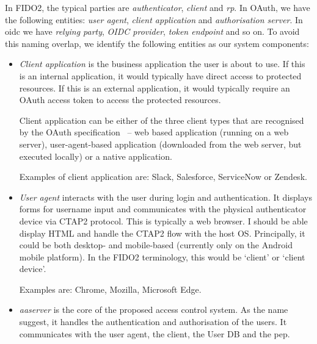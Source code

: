 In FIDO2, the typical parties are \textit{authenticator}, \textit{client} and \textit{\acrshort{rp}}. In OAuth, we have the following entities: \textit{user agent}, \textit{client application} and \textit{authorisation server}. In \acrshort{oidc} we have \textit{relying party}, \textit{OIDC provider}, \textit{token endpoint} and so on. To avoid this naming overlap, we identify the following entities as our system components:
% 
\begin{itemize}
    \item \textit{Client application} is the business application the user is about to use. If this is an internal application, it would typically have direct access to protected resources. If this is an external application, it would typically require an OAuth access token to access the protected resources.
    
    Client application can be either of the three client types that are recognised by the OAuth specification~\cite{Hardt2012TheFramework} -- web based application (running on a web server), user-agent-based application (downloaded from the web server, but executed locally) or a native application.
    
    Examples of client application are: Slack, Salesforce, ServiceNow or Zendesk.
    
    \item \textit{User agent} interacts with the user during login and authentication. It displays forms for username input and communicates with the physical authenticator device via CTAP2 protocol. This is typically a web browser. I should be able display HTML and handle the CTAP2 flow with the host OS. Principally, it could be both desktop- and mobile-based (currently only on the Android mobile platform). In the FIDO2 terminology, this would be `client' or `client device'.
    
    Examples are: Chrome, Mozilla, Microsoft Edge.
    
    \item \textit{\acrfull{aaserver}} is the core of the proposed access control system. As the name suggest, it handles the authentication and authorisation of the users. It communicates with the user agent, the client, the User DB and the \acrshort{pep}.
    
    

\end{itemize}
